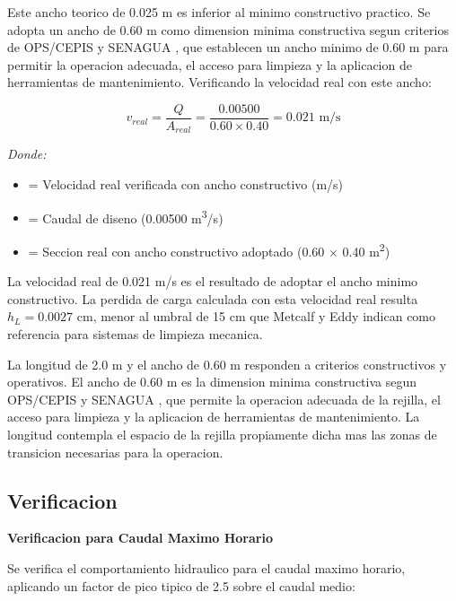 Este ancho teorico de 0.025 m es inferior al minimo constructivo practico. Se adopta un ancho de 0.60 m como dimension minima constructiva segun criterios de OPS/CEPIS \cite{ops2005} y SENAGUA \cite{senagua2012}, que establecen un ancho minimo de 0.60 m para permitir la operacion adecuada, el acceso para limpieza y la aplicacion de herramientas de mantenimiento. Verificando la velocidad real con este ancho:

\begin{equation}
v_{{real}} = \frac{Q}{A_{{real}}} = \frac{0.00500}{0.60 \times 0.40} = 0.021 \text{ m/s}
\end{equation}

\textit{Donde:}
\begin{itemize}[noitemsep,leftmargin=2em]
    \item[$v_{{real}}$] = Velocidad real verificada con ancho constructivo (m/s)
    \item[$Q$] = Caudal de diseno (0.00500 m\textsuperscript{3}/s)
    \item[$A_{{real}}$] = Seccion real con ancho constructivo adoptado (0.60 $\times$ 0.40 m\textsuperscript{2})
\end{itemize}

La velocidad real de 0.021 m/s es el resultado de adoptar el ancho minimo constructivo. La perdida de carga calculada con esta velocidad real resulta $h_L = 0.0027$ cm, menor al umbral de 15 cm que Metcalf y Eddy \cite{metcalf2014} indican como referencia para sistemas de limpieza mecanica.

La longitud de 2.0 m y el ancho de 0.60 m responden a criterios constructivos y operativos. El ancho de 0.60 m es la dimension minima constructiva segun OPS/CEPIS \cite{ops2005} y SENAGUA \cite{senagua2012}, que permite la operacion adecuada de la rejilla, el acceso para limpieza y la aplicacion de herramientas de mantenimiento. La longitud contempla el espacio de la rejilla propiamente dicha mas las zonas de transicion necesarias para la operacion.





\subsection{Verificacion}

\textbf{Verificacion para Caudal Maximo Horario}

Se verifica el comportamiento hidraulico para el caudal maximo horario, aplicando un factor de pico tipico de 2.5 sobre el caudal medio:

